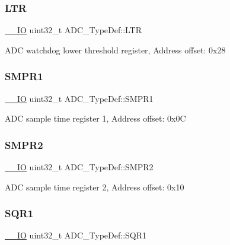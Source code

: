 \subsubsection{\texorpdfstring{L\+TR}{LTR}}
{\footnotesize\ttfamily \hyperlink{core__sc300_8h_aec43007d9998a0a0e01faede4133d6be}{\+\_\+\+\_\+\+IO} uint32\+\_\+t A\+D\+C\+\_\+\+Type\+Def\+::\+L\+TR}

A\+DC watchdog lower threshold register, Address offset\+: 0x28 \mbox{\label{struct_a_d_c___type_def_a73009a8122fcc628f467a4e997109347}} 
\subsubsection{\texorpdfstring{S\+M\+P\+R1}{SMPR1}}
{\footnotesize\ttfamily \hyperlink{core__sc300_8h_aec43007d9998a0a0e01faede4133d6be}{\+\_\+\+\_\+\+IO} uint32\+\_\+t A\+D\+C\+\_\+\+Type\+Def\+::\+S\+M\+P\+R1}

A\+DC sample time register 1, Address offset\+: 0x0C \mbox{\label{struct_a_d_c___type_def_a9e68fe36c4c8fbbac294b5496ccf7130}} 
\subsubsection{\texorpdfstring{S\+M\+P\+R2}{SMPR2}}
{\footnotesize\ttfamily \hyperlink{core__sc300_8h_aec43007d9998a0a0e01faede4133d6be}{\+\_\+\+\_\+\+IO} uint32\+\_\+t A\+D\+C\+\_\+\+Type\+Def\+::\+S\+M\+P\+R2}

A\+DC sample time register 2, Address offset\+: 0x10 \mbox{\label{struct_a_d_c___type_def_a0185aa54962ba987f192154fb7a2d673}} 
\subsubsection{\texorpdfstring{S\+Q\+R1}{SQR1}}
{\footnotesize\ttfamily \hyperlink{core__sc300_8h_aec43007d9998a0a0e01faede4133d6be}{\+\_\+\+\_\+\+IO} uint32\+\_\+t A\+D\+C\+\_\+\+Type\+Def\+::\+S\+Q\+R1}

